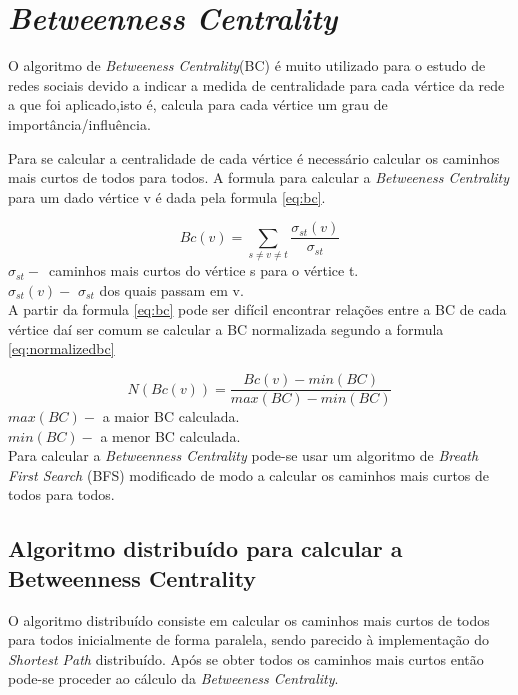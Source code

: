 \section{\textit{Betweenness Centrality}}

O algoritmo de \textit{Betweeness Centrality}(BC) é muito utilizado para o 
estudo de redes sociais devido a indicar a medida de centralidade para cada 
vértice da rede a que foi aplicado,isto é, calcula para cada vértice um grau de 
importância/influência. 

Para se calcular a centralidade de cada vértice é necessário calcular os 
caminhos mais curtos de todos para todos. A formula para calcular a 
\textit{Betweeness Centrality} para um dado vértice v é dada pela formula 
\ref{eq:bc}.

\begin{equation}
	Bc(v) = \sum\limits_{s \neq v \neq t} 
\frac{\sigma_{st}(v)}{\sigma_{st}}
	\label{eq:bc}
\end{equation}
$\sigma_{st}-$~caminhos mais curtos do vértice s para o vértice t.\\
$\sigma_{st}(v)-$ $\sigma_{st}$ dos quais passam em v.\\

A partir da formula \ref{eq:bc} pode ser difícil encontrar relações entre a BC 
de cada vértice daí ser comum se calcular a BC normalizada segundo a formula 
\ref{eq:normalizedbc}

\begin{equation}
	N(Bc(v)) = \frac{Bc(v) - min(BC)}{max(BC)-min(BC)} 
	\label{eq:normalizedbc}
\end{equation}
$max(BC)-$ a maior BC calculada.\\
$min(BC)-$ a menor BC calculada.\\

Para calcular a \textit{Betweenness Centrality} pode-se usar um algoritmo de 
\textit{Breath First Search} (BFS) modificado de modo a calcular os caminhos 
mais curtos de todos para todos. 

\subsection{Algoritmo distribuído para calcular a Betweenness Centrality}
O algoritmo distribuído consiste em calcular os caminhos mais curtos de todos 
para todos inicialmente de forma paralela, sendo parecido à implementação do 
\textit{Shortest Path} distribuído. Após se obter todos os caminhos mais curtos 
então pode-se proceder ao cálculo da \textit{Betweeness Centrality}. 

